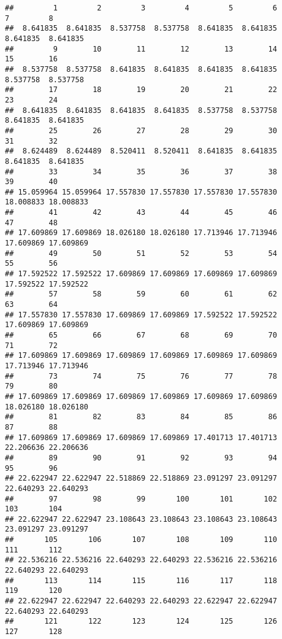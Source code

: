 \documentclass[
]{article}
\begin{document}
\begin{verbatim}
##         1         2         3         4         5         6         7         8 
##  8.641835  8.641835  8.537758  8.537758  8.641835  8.641835  8.641835  8.641835 
##         9        10        11        12        13        14        15        16 
##  8.537758  8.537758  8.641835  8.641835  8.641835  8.641835  8.537758  8.537758 
##        17        18        19        20        21        22        23        24 
##  8.641835  8.641835  8.641835  8.641835  8.537758  8.537758  8.641835  8.641835 
##        25        26        27        28        29        30        31        32 
##  8.624489  8.624489  8.520411  8.520411  8.641835  8.641835  8.641835  8.641835 
##        33        34        35        36        37        38        39        40 
## 15.059964 15.059964 17.557830 17.557830 17.557830 17.557830 18.008833 18.008833 
##        41        42        43        44        45        46        47        48 
## 17.609869 17.609869 18.026180 18.026180 17.713946 17.713946 17.609869 17.609869 
##        49        50        51        52        53        54        55        56 
## 17.592522 17.592522 17.609869 17.609869 17.609869 17.609869 17.592522 17.592522 
##        57        58        59        60        61        62        63        64 
## 17.557830 17.557830 17.609869 17.609869 17.592522 17.592522 17.609869 17.609869 
##        65        66        67        68        69        70        71        72 
## 17.609869 17.609869 17.609869 17.609869 17.609869 17.609869 17.713946 17.713946 
##        73        74        75        76        77        78        79        80 
## 17.609869 17.609869 17.609869 17.609869 17.609869 17.609869 18.026180 18.026180 
##        81        82        83        84        85        86        87        88 
## 17.609869 17.609869 17.609869 17.609869 17.401713 17.401713 22.206636 22.206636 
##        89        90        91        92        93        94        95        96 
## 22.622947 22.622947 22.518869 22.518869 23.091297 23.091297 22.640293 22.640293 
##        97        98        99       100       101       102       103       104 
## 22.622947 22.622947 23.108643 23.108643 23.108643 23.108643 23.091297 23.091297 
##       105       106       107       108       109       110       111       112 
## 22.536216 22.536216 22.640293 22.640293 22.536216 22.536216 22.640293 22.640293 
##       113       114       115       116       117       118       119       120 
## 22.622947 22.622947 22.640293 22.640293 22.622947 22.622947 22.640293 22.640293 
##       121       122       123       124       125       126       127       128 

\end{verbatim}
\end{document}
